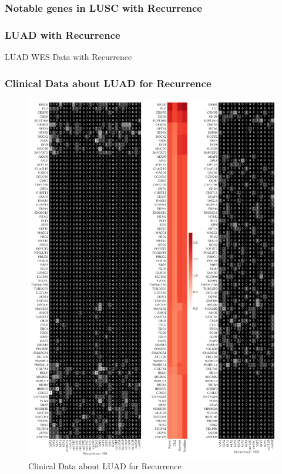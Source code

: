 \documentclass{beamer}
\begin{document}
    \begin{frame}[allowframebreaks]
        \frametitle{Notable genes in LUSC with Recurrence}
    \end{frame}

    \begin{frame}
        \frametitle{LUAD with Recurrence}

        \begin{table}
            \caption{LUAD WES Data with Recurrence}
            \resizebox{!}{0.3 \textheight}
            {}
        \end{table}
    \end{frame}

    \begin{frame}[allowframebreaks]
        \frametitle{Clinical Data about LUAD for Recurrence}

        \begin{figure}
            \includegraphics[height=0.6 \textheight]{figures/GeneClinical/BWA-ADC.Recur.pdf}
            \caption{Clinical Data about LUAD for Recurrence}
        \end{figure}


\end{frame}
\end{document}
